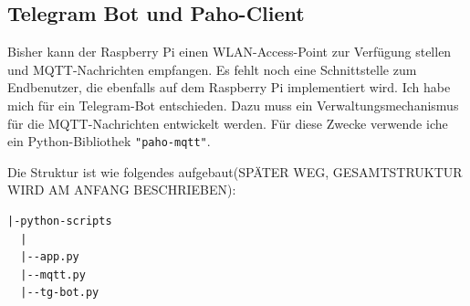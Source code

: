 \documentclass[12pt, letterpaper]{article}
\begin{document}
\subsection{Telegram Bot und Paho-Client}
\par Bisher kann der Raspberry Pi einen WLAN-Access-Point zur Verfügung stellen und MQTT-Nachrichten empfangen. Es fehlt noch eine Schnittstelle zum Endbenutzer, die ebenfalls auf dem Raspberry Pi implementiert wird. Ich habe mich für ein Telegram-Bot entschieden. Dazu muss ein Verwaltungsmechanismus für die MQTT-Nachrichten entwickelt werden. Für diese Zwecke verwende iche ein Python-Bibliothek \texttt{"paho-mqtt"}.
\par Die Struktur ist wie folgendes aufgebaut(SPÄTER WEG, GESAMTSTRUKTUR WIRD AM ANFANG BESCHRIEBEN):
\begin{Verbatim}[frame=single]
  |-python-scripts
  |
  |--app.py
  |--mqtt.py
  |--tg-bot.py
\end{Verbatim}
\end{document}
